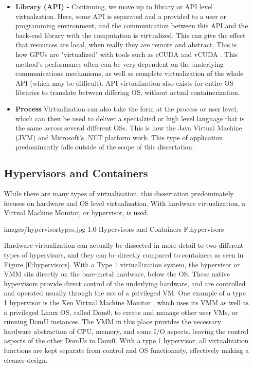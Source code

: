 \begin{itemize}
\item \textbf{Library (API) - }
Continuing, we move up to library or API level virtualzation. Here, some API is separated and a provided to a user or programming environment, and the communication between this API and the back-end library with the computation is virtualized. This can give the effect that resources are local, when really they are remote and abstract. This is how GPUs are "virtualized" with tools such as rCUDA \cite{duato2010rcuda, duato2011enabling} and vCUDA \cite{shi2012vcuda}. This method's performance often can be very dependent on the underlying communications mechanisms, as well as complete virtualization of the whole API (which may be difficult).  API virtualization also exists for entire OS libraries to translate between differing OS, without actual containerization.   

\item \textbf{Process}
Virtualization can also take the form at the process or user level, which can then be used to deliver a specialzied or high level language that is the same across several different OSs. This is how the Java Virtual Machine (JVM) and Microsoft's .NET platform work. This type of application predominantly falls outside of the scope of this dissertation. 


\end{itemize}



\subsection{Hypervisors and Containers}
\label{s:hypervisors}

While there are many types of virtualization, this dissertation predominately focuses on hardware and OS level virtualization. With hardware virtualization, a Virtual Machine Monitor, or hypervisor, is used. 


  {images/hypervisortypes.jpg}
  {1.0}
  {Hypervisors and Containers}
  {F:hypervisors}

Hardware virtualization can actually be dissected in more detail to two different types of hypervisors, and they can be directly compared to containers as seen in Figure \ref{F:hypervisors}. With a Type 1 virtuallization system, the hypervisor or VMM sits directly on the bare-metal hardware, below the OS. These native hypervisors provide direct control of the underlying hardware, and are controlled and operated usually through the use of a privileged VM.  One example of a type 1 hypervisor is the Xen Virtual Machine Monitor \cite{Barham2003}, which uses its VMM as well as a privileged Linux OS, called Dom0, to create and manage other user VMs, or running DomU instances. The VMM in this place provides the necessary hardware abstraction of CPU, memory, and some I/O aspects, leaving the control aspects of the other DomUs to Dom0.  With a type 1 hypervisor, all virtualization functions are kept separate from control and OS functionaity, effectively making a cleaner design. 

